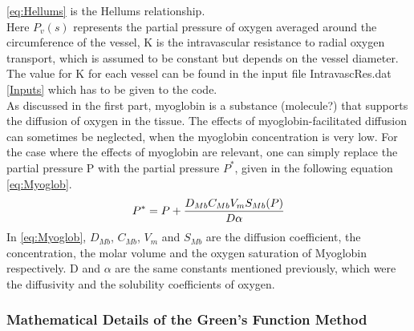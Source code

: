 \ref{eq:Hellums} is the Hellums relationship.
\\Here $P_v(s)$ represents the partial pressure of oxygen averaged around the circumference of the vessel, K is the intravascular resistance to radial oxygen transport, which is assumed to be constant but depends on the vessel diameter. The value for K for each vessel can be found in the input file IntravascRes.dat \ref{Inputs} which has to be given to the code.
%
\\As discussed in the first part, myoglobin is a substance (molecule?) that supports the diffusion of oxygen in the tissue. The effects of myoglobin-facilitated diffusion can sometimes be neglected, when the myoglobin concentration is very low. For the case where the effects of myoglobin are relevant, one can simply replace the partial pressure P with the partial pressure $P^*$, given in the following equation \ref{eq:Myoglob}.
\begin{equation}
\\P^* = P + \frac{D_{Mb}C_{Mb}V_mS_{Mb}(P)}{D \alpha}
\label{eq:Myoglob}
\end{equation}
In \ref{eq:Myoglob}, $D_{Mb}$, $C_{Mb}$, $V_m$ and $S_{Mb}$ are the diffusion coefficient, the concentration, the molar volume and the oxygen saturation of Myoglobin respectively. D and $\alpha$ are the same constants mentioned previously, which were the diffusivity and the solubility coefficients of oxygen.

\subsubsection{Mathematical Details of the Green's Function Method}


